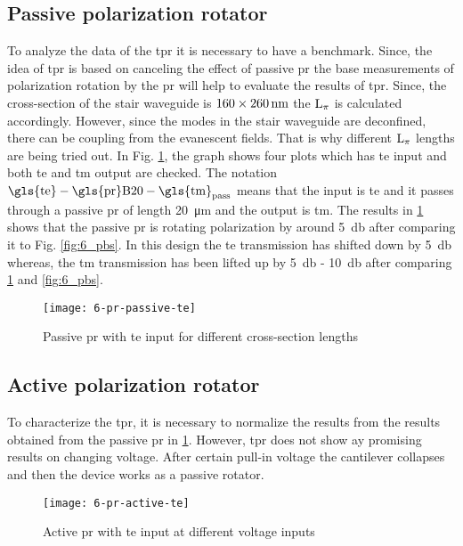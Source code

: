 \documentclass[../report.tex]{subfiles}
\begin{document}
	\subsection{Passive polarization rotator}
	To analyze the data of the \gls{tpr} it is necessary to have a benchmark. Since, the idea of \gls{tpr} is based on canceling the effect of passive \gls{pr} the base measurements of polarization rotation by the \gls{pr} will help to evaluate the results of \gls{tpr}. Since, the cross-section of the stair waveguide is $\mathrm{160 \times \SI{260}{\nano \meter}}$ the $\mathrm{L_\pi}$ is calculated accordingly. However, since the modes in the stair waveguide are deconfined, there can be coupling from the evanescent fields. That is why different $\mathrm{L_\pi}$ lengths are being tried out. In Fig. \ref{fig:6_pr_passive_te}, the graph shows four plots which has \gls{te} input and both \gls{te} and \gls{tm} output are checked. The notation $\chem{\gls{te}-\gls{pr}B20-\gls{tm}_{pass}}$ means that the input is \gls{te} and it passes through a passive \gls{pr} of length \SI{20}{\micro \meter} and the output is \gls{tm}. The results in \ref{fig:6_pr_passive_te} shows that the passive \gls{pr} is rotating polarization by around \SI{5}{\decibel} after comparing it to Fig. \ref{fig:6_pbs}. In this design the \gls{te} transmission has shifted down by \SI{5}{\decibel} whereas, the \gls{tm} transmission has been lifted up by \SI{5}{\decibel} - \SI{10}{\decibel} after comparing \ref{fig:6_pr_passive_te} and \ref{fig:6_pbs}.
	
	\begin{figure}[H] %
		\centering
		\texttt{[image: 6-pr-passive-te]}
		\caption{Passive \gls{pr} with \gls{te} input for different cross-section lengths}
		\label{fig:6_pr_passive_te}
	\end{figure}
	
	\subsection{Active polarization rotator}
	To characterize the \gls{tpr}, it is necessary to normalize the results from the results obtained from the passive \gls{pr} in \ref{fig:6_pr_passive_te}. However, \gls{tpr} does not show ay promising results on changing voltage. After certain pull-in voltage the cantilever collapses and then the device works as a passive rotator. 
	\begin{figure}[H] %
		\centering
		\texttt{[image: 6-pr-active-te]}
		\caption{Active \gls{pr} with \gls{te} input at different voltage inputs}
		\label{fig:6_pr_active_te}
	\end{figure}
	
\end{document}
